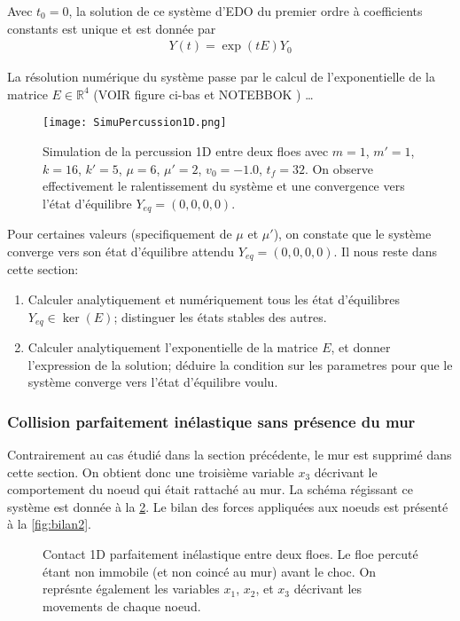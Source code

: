 \noindent Avec $t_0= 0$, la solution de ce système d'EDO du premier ordre à coefficients constants est unique et est donnée par
\begin{align}
    Y(t) = \exp(tE)Y_0
\end{align}

La résolution numérique du système passe par le calcul de l'exponentielle de la matrice $E \in  \mathbb{R}^4$ (VOIR figure ci-bas et NOTEBBOK ) \ldots
\begin{figure}[!h]
    \centering
    \texttt{[image: SimuPercussion1D.png]}
    \caption{Simulation de la percussion 1D entre deux floes avec $m=1$, $m'=1$, $k=16$, $k'=5$, $\mu=6$,
        $\mu'=2$, $v_0=-1.0$, $t_{f}=32$. On observe effectivement le ralentissement du système et une convergence
        vers l'état d'équilibre $Y_{eq}= (0,0,0,0)$.}
    \label{fig:simucontact1d}
\end{figure}

\noindent Pour certaines valeurs (specifiquement de $\mu$ et $\mu'$), on constate que le système converge vers son état d'équilibre attendu $Y_{eq} = (0,0,0,0)$. Il nous reste dans cette section:
\begin{enumerate}
    \item Calculer analytiquement et numériquement tous les état d'équilibres $Y_{eq} \in \ker(E)$; distinguer les états stables des autres.
    \item Calculer analytiquement l'exponentielle de la matrice $E$, et donner l'expression de la solution; déduire la condition sur les parametres pour que le système converge vers l'état d'équilibre voulu.
\end{enumerate} 







\subsubsection{Collision parfaitement inélastique sans présence du mur}

Contrairement au cas étudié dans la section précédente, le mur est supprimé dans cette section. On obtient donc une troisième variable $x_3$ décrivant le comportement du noeud qui était rattaché au mur. La schéma régissant ce système est donnée à la \cref{fig:contact1d2}. Le bilan des forces appliquées aux noeuds est présenté à la \cref{fig:bilan2}.

\begin{figure}[!h]
    \centering
    \caption{Contact 1D parfaitement inélastique entre deux floes. Le floe percuté étant non immobile (et non coincé au mur) avant le choc. On représnte également les variables $x_1$, $x_2$, et $x_3$ décrivant les movements de chaque noeud.}
    \label{fig:contact1d2}
\end{figure}

